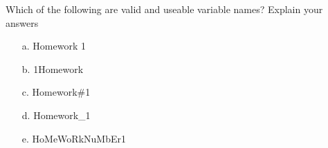 {Which of the following are valid and useable variable names?  Explain your answers

\begin{enumerate}
	\item[a.] Homework 1
	\item[b.] 1Homework
	\item[c.] Homework\#1
	\item[d.] Homework\_1
	\item[e.] HoMeWoRkNuMbEr1
\end{enumerate}}
{}
